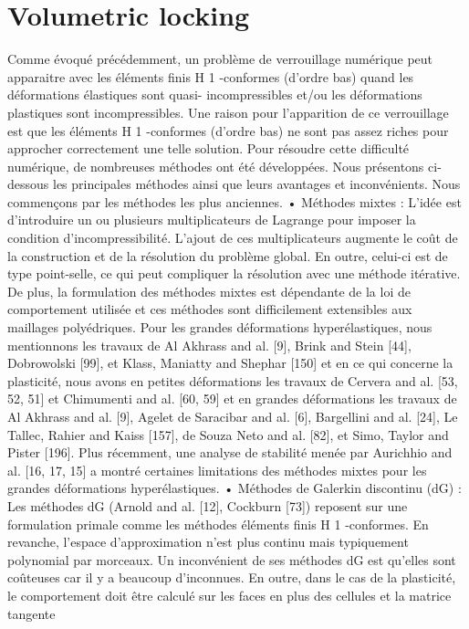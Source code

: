 \section{Volumetric locking}
\label{sec:hho:volumetric_locking}

Comme évoqué précédemment, un problème de verrouillage numérique peut apparaitre avec
les éléments finis H 1 -conformes (d’ordre bas) quand les déformations élastiques sont quasi-
incompressibles et/ou les déformations plastiques sont incompressibles. Une raison pour
l’apparition de ce verrouillage est que les éléments H 1 -conformes (d’ordre bas) ne sont pas
assez riches pour approcher correctement une telle solution. Pour résoudre cette difficulté
numérique, de nombreuses méthodes ont été développées. Nous présentons ci-dessous les
principales méthodes ainsi que leurs avantages et inconvénients. Nous commençons par les
méthodes les plus anciennes.
• Méthodes mixtes : L’idée est d’introduire un ou plusieurs multiplicateurs de Lagrange
pour imposer la condition d’incompressibilité. L’ajout de ces multiplicateurs augmente
le coût de la construction et de la résolution du problème global. En outre, celui-ci est
de type point-selle, ce qui peut compliquer la résolution avec une méthode itérative.
De plus, la formulation des méthodes mixtes est dépendante de la loi de comportement
utilisée et ces méthodes sont difficilement extensibles aux maillages polyédriques. Pour
les grandes déformations hyperélastiques, nous mentionnons les travaux de Al Akhrass
and al. [9], Brink and Stein [44], Dobrowolski [99], et Klass, Maniatty and Shephar [150]
et en ce qui concerne la plasticité, nous avons en petites déformations les travaux de
Cervera and al. [53, 52, 51] et Chimumenti and al. [60, 59] et en grandes déformations les
travaux de Al Akhrass and al. [9], Agelet de Saracibar and al. [6], Bargellini and al. [24],
Le Tallec, Rahier and Kaiss [157], de Souza Neto and al. [82], et Simo, Taylor and Pister
[196]. Plus récemment, une analyse de stabilité menée par Aurichhio and al. [16, 17,
15] a montré certaines limitations des méthodes mixtes pour les grandes déformations
hyperélastiques.
• Méthodes de Galerkin discontinu (dG) : Les méthodes dG (Arnold and al. [12],
Cockburn [73]) reposent sur une formulation primale comme les méthodes éléments
finis H 1 -conformes. En revanche, l’espace d’approximation n’est plus continu mais
typiquement polynomial par morceaux. Un inconvénient de ses méthodes dG est qu’elles
sont coûteuses car il y a beaucoup d’inconnues. En outre, dans le cas de la plasticité, le
comportement doit être calculé sur les faces en plus des cellules et la matrice tangente
